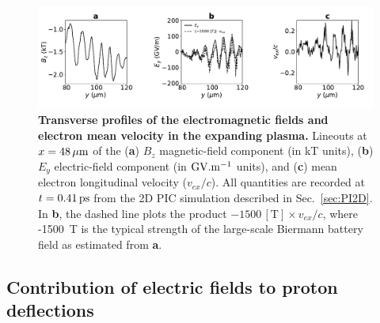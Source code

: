 \documentclass[aps,superscriptaddress]{revtex4}
\begin{document}
\begin{figure}[ht] 
\centerline{
\includegraphics[width=1\textwidth]{FigS8.pdf} }
\caption{\label{fig:cut} 
\textbf{Transverse profiles of the electromagnetic fields and electron mean velocity in the expanding plasma.}
Lineouts at $x=48\,\rm \mu m$ of the ({\bf a}) $B_z$ magnetic-field component (in kT units), ({\bf b}) $E_y$ electric-field component (in $\rm GV.m^{-1}$ units), and ({\bf c}) mean electron longitudinal velocity ($v_{ex}/c$). All quantities are recorded at $t=0.41\,\rm ps$ from the 2D PIC simulation described in Sec.~\ref{sec:PI2D}. In {\bf b}, the dashed line plots the product $-1500\,[\mathrm{T}] \times v_{ex}/c$, where -1500~T is the typical strength of the large-scale Biermann battery field as estimated from {\bf a}.
}
\end{figure}

\subsection{Contribution of electric fields to proton deflections}
\label{subsec:elec_deflec}
\end{document}
